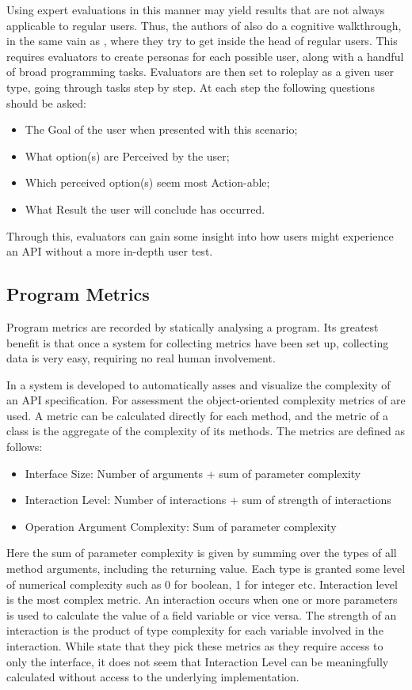 Using expert evaluations in this manner may yield results that are not always applicable to regular users.
Thus, the authors of \cite{beaton2008usability} also do a cognitive walkthrough, in the same vain as \cite{o2010api}, where they try to get inside the head of regular users. 
This requires evaluators to create personas for each possible user, along with a handful of broad programming tasks.
Evaluators are then set to roleplay as a given user type, going through tasks step by step. 
At each step the following questions should be asked: 
\begin{itemize}
\item The Goal of the user when presented with this scenario;
\item  What option(s) are Perceived by the user;
\item Which perceived option(s) seem most Action-able;
\item What Result the user will conclude has occurred.
\end{itemize}
Through this, evaluators can gain some insight into how users might experience an \gls{API} without a more in-depth user test.

\subsection{Program Metrics}
Program metrics are recorded by statically analysing a program.
Its greatest benefit is that once a system for collecting metrics have been set up, collecting data is very easy, requiring no real human involvement. 

In \cite{de2009automatic} a system is developed to automatically asses and visualize the complexity of an \gls{API} specification.
For assessment the object-oriented complexity metrics of \cite{bandi2003predicting} are used. 
A metric can be calculated directly for each method, and the metric of a class is the aggregate of the complexity of its methods. 
The metrics are defined as follows:

\begin{itemize}
\item  Interface Size: Number of arguments + sum of parameter complexity
\item Interaction Level: Number of interactions + sum of strength of interactions
\item Operation Argument Complexity: Sum of parameter complexity
\end{itemize} 

Here the sum of parameter complexity is given by summing over the types of all method arguments, including the returning value.
Each type is granted some level of numerical complexity such as 0 for boolean, 1 for integer etc.
Interaction level is the most complex metric.
An interaction occurs when one or more parameters is used to calculate the value of a field variable or vice versa.
The strength of an interaction is the product of type complexity for each variable involved in the interaction.
While \cite{de2009automatic} state that they pick these metrics as they require access to only the interface, it does not seem that Interaction Level can be meaningfully calculated without access to the underlying implementation. 

